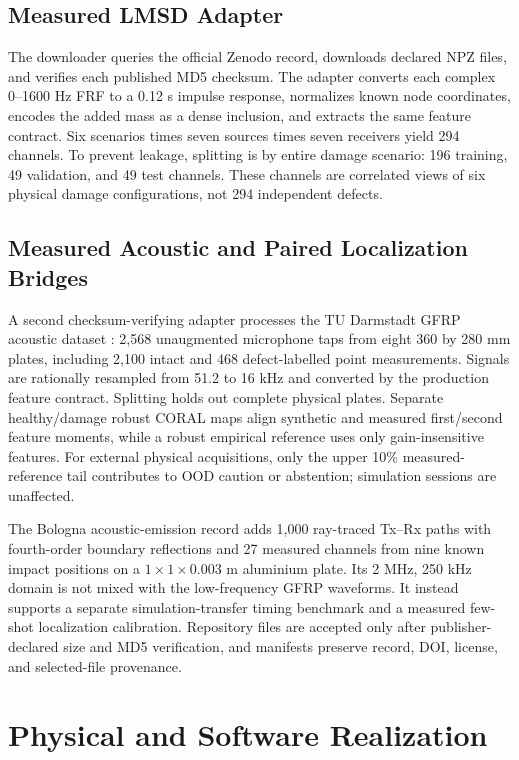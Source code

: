\documentclass[conference]{IEEEtran}
\begin{document}
\subsection{Measured LMSD Adapter}
The downloader queries the official Zenodo record, downloads declared NPZ files, and verifies each published MD5 checksum. The adapter converts each complex 0--1600 Hz FRF to a 0.12 s impulse response, normalizes known node coordinates, encodes the added mass as a dense inclusion, and extracts the same feature contract. Six scenarios times seven sources times seven receivers yield 294 channels. To prevent leakage, splitting is by entire damage scenario: 196 training, 49 validation, and 49 test channels. These channels are correlated views of six physical damage configurations, not 294 independent defects.

\subsection{Measured Acoustic and Paired Localization Bridges}
A second checksum-verifying adapter processes the TU Darmstadt GFRP acoustic dataset \cite{feldmann2026dataset}: 2,568 unaugmented microphone taps from eight 360 by 280 mm plates, including 2,100 intact and 468 defect-labelled point measurements. Signals are rationally resampled from 51.2 to 16 kHz and converted by the production feature contract. Splitting holds out complete physical plates. Separate healthy/damage robust CORAL maps align synthetic and measured first/second feature moments, while a robust empirical reference uses only gain-insensitive features. For external physical acquisitions, only the upper 10\% measured-reference tail contributes to OOD caution or abstention; simulation sessions are unaffected.

The Bologna acoustic-emission record \cite{zonzini2024dataset} adds 1,000 ray-traced Tx--Rx paths with fourth-order boundary reflections and 27 measured channels from nine known impact positions on a $1\times1\times0.003$ m aluminium plate. Its 2 MHz, 250 kHz domain is not mixed with the low-frequency GFRP waveforms. It instead supports a separate simulation-transfer timing benchmark and a measured few-shot localization calibration. Repository files are accepted only after publisher-declared size and MD5 verification, and manifests preserve record, DOI, license, and selected-file provenance.

\section{Physical and Software Realization}
\end{document}
